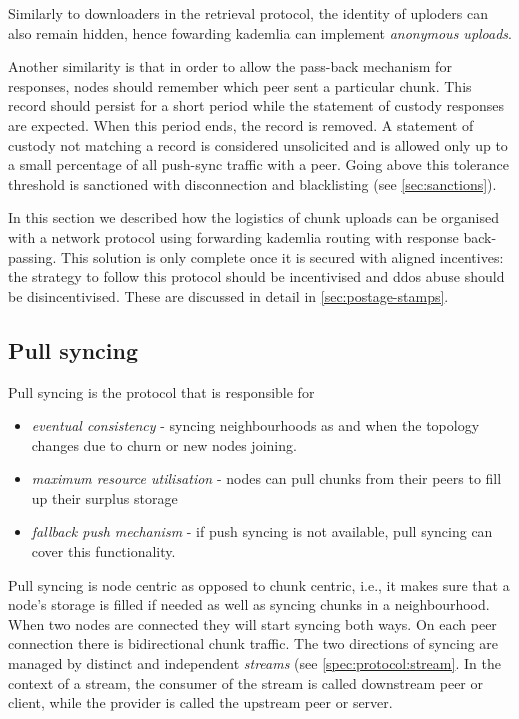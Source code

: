 Similarly to downloaders in the retrieval protocol, the identity of uploders can also remain hidden, hence fowarding kademlia can implement \emph{anonymous uploads}.

Another similarity is that in order to allow the pass-back mechanism for responses, nodes should remember which peer sent a particular chunk. This record should persist for a short period while the statement of custody responses are expected. When this period ends, the record is removed. A statement of custody not matching a record is considered unsolicited and is allowed only up to a small percentage of all push-sync traffic with a peer. Going above this tolerance threshold is sanctioned with disconnection and blacklisting (see \ref{sec:sanctions}).

In this section we described how the logistics of chunk uploads can be organised with a network protocol using forwarding kademlia routing with response back-passing. This solution is only complete once it is secured with aligned incentives:  
the strategy to follow this protocol should be incentivised and ddos abuse should be disincentivised. These are discussed in detail in \ref{sec:postage-stamps}.


\subsection{Pull syncing}\label{sec:pull-syncing}

Pull syncing is the protocol that is responsible for 

\begin{itemize}
    \item \emph{eventual consistency} - syncing neighbourhoods as and when the topology changes due to churn or new nodes joining.
    \item \emph{maximum resource utilisation} - nodes can pull chunks from their peers to fill up their surplus storage 
    \item \emph{fallback push mechanism} - if push syncing is not available, pull  syncing can cover this functionality.  
\end{itemize}

Pull syncing is node centric as opposed to chunk centric, i.e., it makes sure that a node's  storage is filled if needed as well as syncing chunks in a neighbourhood. When two nodes are connected they will start syncing both ways. On each peer connection there is bidirectional chunk traffic. The two directions of syncing are managed by distinct and independent \emph{streams} (see \ref{spec:protocol:stream}. In the context of a stream, the consumer of the stream is called downstream peer or client, while the provider is called the upstream peer or server. 

